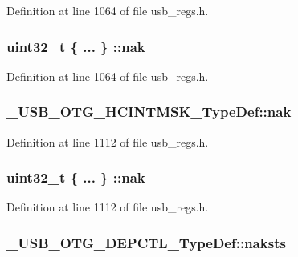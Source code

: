 Definition at line 1064 of file usb\-\_\-regs.\-h.

\hypertarget{group___u_s_b___o_t_g___d_r_i_v_e_r_gae147a68f3fbddfeaaaec39a9457ead70}{
\subsubsection[{nak}]{\setlength{\rightskip}{0pt plus 5cm}uint32\-\_\-t \{ ... \} \-::nak}}\label{group___u_s_b___o_t_g___d_r_i_v_e_r_gae147a68f3fbddfeaaaec39a9457ead70}


Definition at line 1064 of file usb\-\_\-regs.\-h.

\hypertarget{group___u_s_b___o_t_g___d_r_i_v_e_r_ga103fcc638785131143028bce08cb0680}{
\subsubsection[{nak}]{ \-\_\-\-U\-S\-B\-\_\-\-O\-T\-G\-\_\-\-H\-C\-I\-N\-T\-M\-S\-K\-\_\-\-Type\-Def\-::nak}}\label{group___u_s_b___o_t_g___d_r_i_v_e_r_ga103fcc638785131143028bce08cb0680}


Definition at line 1112 of file usb\-\_\-regs.\-h.

\hypertarget{group___u_s_b___o_t_g___d_r_i_v_e_r_gaad4201106a74a899a297e6828dc5b48a}{
\subsubsection[{nak}]{\setlength{\rightskip}{0pt plus 5cm}uint32\-\_\-t \{ ... \} \-::nak}}\label{group___u_s_b___o_t_g___d_r_i_v_e_r_gaad4201106a74a899a297e6828dc5b48a}


Definition at line 1112 of file usb\-\_\-regs.\-h.

\hypertarget{group___u_s_b___o_t_g___d_r_i_v_e_r_gac13fa9b6bc3238163c2efd7df474dc04}{
\subsubsection[{naksts}]{ \-\_\-\-U\-S\-B\-\_\-\-O\-T\-G\-\_\-\-D\-E\-P\-C\-T\-L\-\_\-\-Type\-Def\-::naksts}}\label{group___u_s_b___o_t_g___d_r_i_v_e_r_gac13fa9b6bc3238163c2efd7df474dc04}


